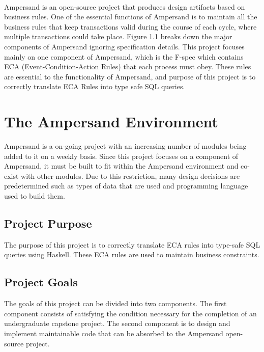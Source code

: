 \documentclass[12pt]{report}
\begin{document}
\paragraph{}
Ampersand is an open-source project that produces design artifacts based on 
business rules. One of the essential functions of Ampersand is to maintain all 
the business rules that keep transactions valid during the course of each 
cycle, where multiple transactions could take place.  Figure 1.1  breaks 
down the major components of Ampersand ignoring specification details. This 
project focuses mainly on one component of Ampersand, which is the F-spec which 
contains ECA (Event-Condition-Action Rules) that each process must obey. These 
rules are essential to the functionality of Ampersand, and purpose of this 
project is to correctly translate ECA Rules into type safe SQL queries.
{\section{The Ampersand Environment}\label{sec:Purpose}}
Ampersand is a on-going project with an increasing number of modules being
added to it on a weekly basis. Since this project focuses on a component of 
Ampersand, it must be built to fit within the Ampersand environment and 
co-exist with other modules. Due to this restriction, many design decisions are 
predetermined such as types of data that are used and programming language used 
to build them.
\subsection{Project Purpose}
The purpose of this project is to correctly translate ECA rules
 into type-safe SQL queries using Haskell. These ECA rules are used to 
maintain business constraints.
\subsection{Project Goals} 
The goals of this project can be divided into two components. The first 
component consists of satisfying the condition necessary for the completion of 
an undergraduate capstone project. The second component is to design and 
implement maintainable code that can be absorbed to the Ampersand open-source 
project. 
\end{document}
